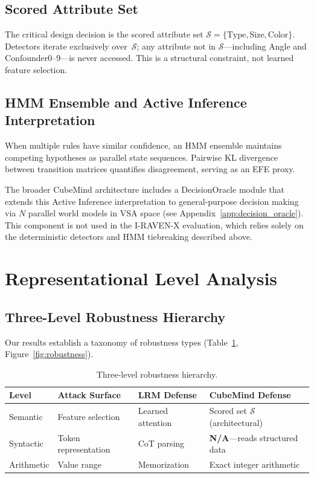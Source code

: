 \documentclass{article}
\begin{document}
\subsection{Scored Attribute Set}

The critical design decision is the scored attribute set $\mathcal{S} = \{\text{Type}, \text{Size}, \text{Color}\}$. Detectors iterate exclusively over~$\mathcal{S}$; any attribute not in $\mathcal{S}$---including Angle and Confounder0--9---is never accessed. This is a structural constraint, not learned feature selection.

\subsection{HMM Ensemble and Active Inference Interpretation}

When multiple rules have similar confidence, an HMM ensemble maintains competing hypotheses as parallel state sequences. Pairwise KL divergence between transition matrices quantifies disagreement, serving as an EFE proxy.

The broader CubeMind architecture includes a DecisionOracle module that extends this Active Inference interpretation to general-purpose decision making via $N$ parallel world models in VSA space (see Appendix~\ref{app:decision_oracle}). This component is not used in the I-RAVEN-X evaluation, which relies solely on the deterministic detectors and HMM tiebreaking described above.

\section{Representational Level Analysis}

\subsection{Three-Level Robustness Hierarchy}

Our results establish a taxonomy of robustness types (Table~\ref{tab:hierarchy}, Figure~\ref{fig:robustness}).

\begin{table}[t]
\caption{Three-level robustness hierarchy.}
\label{tab:hierarchy}
\centering
\small
\begin{tabular}{@{}llll@{}}
\toprule
\textbf{Level} & \textbf{Attack Surface} & \textbf{LRM Defense} & \textbf{CubeMind Defense} \\
\midrule
Semantic & Feature selection & Learned attention & Scored set $\mathcal{S}$ (architectural) \\
Syntactic & Token representation & CoT parsing & \textbf{N/A}---reads structured data \\
Arithmetic & Value range & Memorization & Exact integer arithmetic \\
\bottomrule
\end{tabular}
\end{table}
\end{document}
